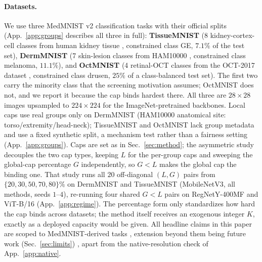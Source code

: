 \documentclass[10pt]{article}
\begin{document}
\paragraph{Datasets.}
We use three MedMNIST v2 \citep{yang2023medmnist} classification tasks with
their official splits %
{(App.~\ref{app:groups} describes all three in full)}:
\textbf{TissueMNIST} (8 kidney-cortex-cell classes from human kidney
tissue \citep{woloshuk2021situ}, constrained class GE, $7.1\%$ of the
test set), \textbf{DermMNIST} (7 skin-lesion classes from
HAM10000 \citep{tschandl2018ham10000}, constrained class melanoma,
$11.1\%$), and \textbf{OctMNIST} (4 retinal-OCT classes from the
OCT-2017 dataset \citep{kermany2018identifying}, constrained class
drusen, $25\%$ of a class-balanced test set). The first two carry the minority class that
the screening motivation assumes; OctMNIST does not, and we report it
because the cap binds hardest there. All three are $28{\times}28$ images
upsampled to $224{\times}224$ for the ImageNet-pretrained backbones. Local
caps use real groups only on DermMNIST (HAM10000 anatomical site:
torso/extremity/head-neck); TissueMNIST and OctMNIST lack group metadata and
use a fixed synthetic split, a mechanism test rather than a fairness
setting (App.~\ref{app:groups}). %
{Caps are set as in Sec.~\ref{sec:method};} the
asymmetric study decouples the two cap types, keeping $L$ for the per-group
caps and sweeping the global-cap percentage $G$ independently, so $G{<}L$
makes the global cap the binding one. That study runs all $20$ off-diagonal
$(L,G)$ pairs from $\{20,30,50,70,80\}\%$ on DermMNIST and TissueMNIST
(MobileNetV3, all methods, seeds $1$--$4$), re-running four shared $G{<}L$
pairs on RegNetY-400MF and ViT-B/16 (App.~\ref{app:regime}). The
percentage form only standardizes how hard the cap binds across datasets;
the method itself receives an exogenous integer $K$, exactly as a deployed
capacity would be given. All headline claims in this paper are scoped to
MedMNIST-derived tasks%
{, extension beyond them being future work} (Sec.~\ref{sec:limits})%
{, apart from the native-resolution check of App.~\ref{app:native}}.
\end{document}
